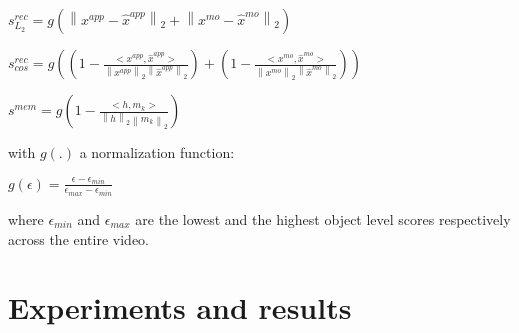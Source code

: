 \documentclass{article}
\begin{document}
 $s^{rec}_{L_{2}} = g\left(\left\lVert x^{app} - \hat{x}^{app}\right\rVert_{2} + \left\lVert x^{mo} - \hat{x}^{mo}\right\rVert_{2}\right)$

 $s^{rec}_{cos} =g\left( (1-\frac{<x^{app},\hat{x}^{app}>}{\left\lVert x^{app}\right\rVert_{2} \left\lVert \hat{x}^{app} \right\rVert_{2}}) +( 1-\frac{<x^{mo},\hat{x}^{mo}>}{\left\lVert x^{mo}\right\rVert_{2} \left\lVert \hat{x}^{mo} \right\rVert_{2}})\right)$
 
$s^{mem} = g\left(1-\frac{<h,m_k>}{\left\lVert h\right\rVert_{2} \left\lVert m_k \right\rVert_{2}}\right)$

with $g(.)$ a normalization function:

$g(\epsilon) = \frac{\epsilon - \epsilon_{min} }{\epsilon_{max} - \epsilon_{min}}$

where $\epsilon_{min}$ and $\epsilon_{max}$ are the lowest and the highest object level scores respectively across the entire video.




\section{Experiments and results}
\label{sec:format}
\end{document}
